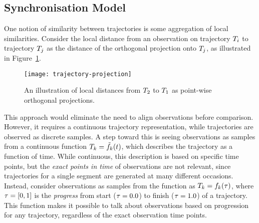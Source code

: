 \subsection{Synchronisation Model}
One notion of similarity between trajectories is some aggregation of
local similarities. Consider the local distance from an observation on trajectory
$T_{i}$ to trajectory $T_{j}$ as the distance of the orthogonal
projection onto $T_{j}$, as illustrated in Figure~\ref{fig:trajectory-projection}.
\begin{figure}
  \centering
  \texttt{[image: trajectory-projection]}
  \caption{An illustration of local distances from $T_2$ to
  $T_1$ as point-wise orthogonal projections.}\label{fig:trajectory-projection}
\end{figure}
This approach would eliminate the need to align observations before
comparison. However, it requires a continuous trajectory
representation, while trajectories are observed as discrete samples.
A step toward this is seeing observations as samples from a continuous function
$T_{k} = \tilde{f}_{k}(t)$, which describes the trajectory as a function of
time. While continuous, this description is based on specific time
points, but the \textit{exact points in time} of observations are not
relevant, since trajectories for a single segment are generated at many different
occasions. Instead, consider observations as samples from the function
as $T_{k} = f_{k}(\tau)$, where $\tau = [0, 1]$ is the \textit{progress} from
start ($\tau = 0.0$) to finish ($\tau = 1.0$) of
a trajectory. This function makes it possible to talk about observations based on
progression for any trajectory, regardless of the exact observation time points. 


